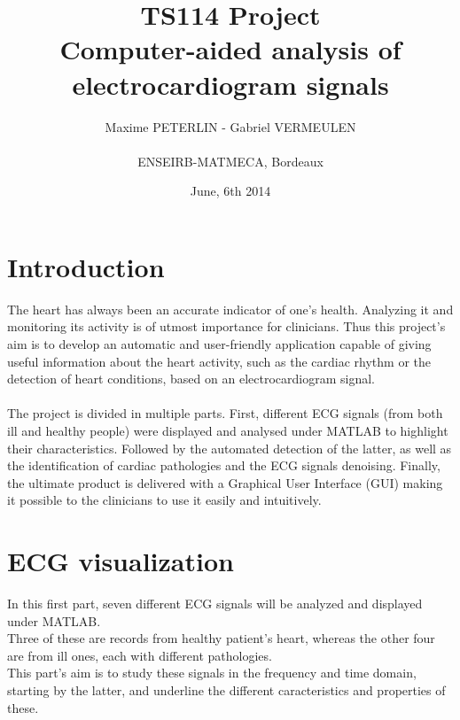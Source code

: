 \documentclass[11pt]{article}
\title{\textbf{TS114 Project}\\Computer-aided analysis of electrocardiogram signals}
\author{{Maxime PETERLIN - Gabriel VERMEULEN }\\\\{ENSEIRB-MATMECA, Bordeaux}}
\date{June, 6th 2014}
\begin{document}
\maketitle
\tableofcontents

\newpage

\section{Introduction}
	The heart has always been an accurate indicator of one's health. Analyzing it and monitoring its activity is of utmost importance for clinicians. Thus this project's aim is to develop an automatic and user-friendly application capable of giving useful information about the heart activity, such as the cardiac rhythm or the detection of heart conditions, based on an electrocardiogram signal.\\\\
	The project is divided in multiple parts. First, different ECG signals (from both ill and healthy people) were displayed and analysed under MATLAB to highlight their characteristics. Followed by the automated detection of the latter, as well as the identification of cardiac pathologies and the ECG signals denoising. Finally, the ultimate product is delivered with a Graphical User Interface (GUI) making it possible to the clinicians to use it easily and intuitively.\\


\section{ECG visualization}
	In this first part, seven different ECG signals will be analyzed and displayed under MATLAB. \\Three of these are records from healthy patient's heart, whereas the other four are from ill ones, each with different pathologies.\\
	This part's aim is to study these signals in the frequency and time domain, starting by the latter, and underline the different caracteristics and properties of these.
\end{document}
